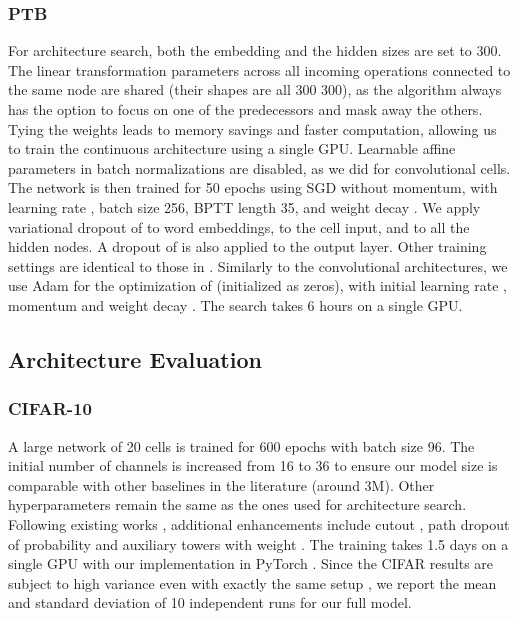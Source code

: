 \documentclass{article}
\begin{document}
\subsubsection{PTB}
\label{sec:search-ptb}
For architecture search,
both the embedding and the hidden sizes are set to 300.
The linear transformation parameters across all incoming operations connected to the same node are shared (their shapes are all 300  300),
as the algorithm always has the option to focus on one of the predecessors and mask away the others.
Tying the weights leads to memory savings and faster computation,
allowing us to train the continuous architecture using a single GPU.
Learnable affine parameters in batch normalizations are disabled, as we did for convolutional cells.
The network is then trained for 50 epochs using SGD without momentum,
with learning rate ,
batch size 256,
BPTT length 35,
and weight decay .
We apply
variational dropout \citep{gal2016theoretically} of  to word embeddings,
 to the cell input,
and  to all the hidden nodes.
A dropout of  is also applied to the output layer.
Other training settings are identical to those in \cite{merity2017regularizing, yang2017breaking}.
Similarly to the convolutional architectures, we use Adam for the optimization of  (initialized as zeros),
with initial learning rate ,
momentum  and weight decay .
The search takes 6 hours on a single GPU.

\subsection{Architecture Evaluation}
\subsubsection{CIFAR-10}
\label{sec:eval-cifar10}
A large network of 20 cells is trained for 600 epochs with batch size 96.
The initial number of channels is increased from 16 to 36 to ensure our model size is comparable with other baselines in the literature (around 3M).
Other hyperparameters remain the same as the ones used for architecture search.
Following existing works \citep{pham2018efficient, zoph2017learning, liu2017progressive, real2018regularized},
additional enhancements include cutout \citep{devries2017improved},
path dropout of probability  and auxiliary towers with weight .
The training takes 1.5 days on a single GPU
with our implementation in PyTorch \citep{paszke2017automatic}.
Since the CIFAR results are subject to high variance even with exactly the same setup \citep{liu2017hierarchical},
we report the mean and standard deviation of 10 independent runs for our full model.
\end{document}
